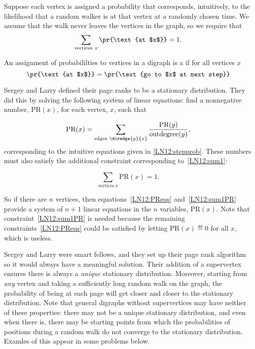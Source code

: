 Suppose each vertex is assigned a probability that corresponds, intuitively,
to the likelihood that a random walker is at that vertex at a randomly
chosen time.  We assume that the walk never leaves the vertices in the graph,
so we require that
\begin{equation}\label{LN12:sum1}
\sum_{\text{vertices}\ x} \pr{\text{at $x$}} = 1.
\end{equation}

\begin{definition} An assignment of probabililties to vertices in a digraph
  is a  if for all vertices $x$
\[
\pr{\text{at $x$}} = \pr{\text{go to $x$ at next step}}
\]
\end{definition}  

Sergey and Larry defined their page ranks to be a stationary distribution.
They did this by solving the following system of linear equations: find a
nonnegative number, $\text{PR}(x)$, for each vertex, $x$, such that

\begin{equation}\label{LN12:PReqs}
\text{PR}(x) = \sum_{\text{edges}\ \diredge{y}{x}} \frac{\text{PR}(y)}{\text{outdegree}(y)},
\end{equation}
corresponding to the intuitive equations given in \eqref{LN12:stepprob}.
These numbers must also satisfy the additional constraint corresponding
to~\eqref{LN12:sum1}:

\begin{equation}\label{LN12:sum1PR}
\sum_{\text{vertices}\ x} \text{PR}(x) = 1.
\end{equation}

So if there are $n$ vertices, then equations~\eqref{LN12:PReqs}
and~\eqref{LN12:sum1PR} provide a system of $n+1$ linear equations in the
$n$ variables, $\text{PR}(x)$.  Note that constraint~\eqref{LN12:sum1PR}
is needed because the remaining constraints~\eqref{LN12:PReqs} could be
satisfied by letting $\text{PR}(x)\eqdef 0$ for all $x$, which is useless.

Sergey and Larry were smart fellows, and they set up their page rank
algorithm so it would always have a meaningful solution.  Their addition
of a supervertex ensures there is always a \emph{unique} stationary
distribution.  Moreover, starting from \emph{any} vertex and taking a
sufficiently long random walk on the graph, the probability of being at
each page will get closer and closer to the stationary distribution.  Note
that general digraphs without supervertices may have neither of these
properties: there may not be a unique stationary distribution, and even
when there is, there may be starting points from which the probabilities
of positions during a random walk do not converge to the stationary
distribution.  Examles of this appear in some problems below.

